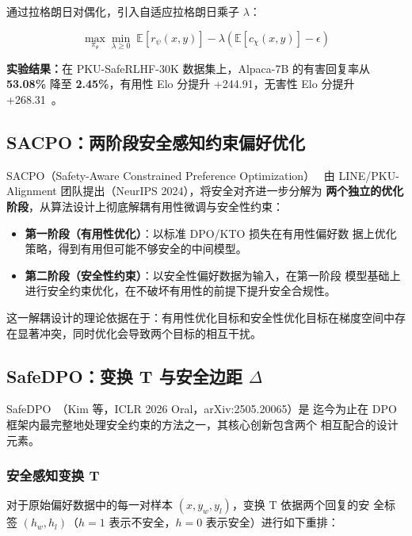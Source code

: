 \documentclass[12pt,a4paper,UTF8]{ctexart}
\newcommand{\E}{\mathbb{E}}
\newcommand{\pitheta}{\pi_{\theta}}
\begin{document}
通过拉格朗日对偶化，引入自适应拉格朗日乘子 $\lambda$：

\begin{equation}
  \max_{\pitheta}\min_{\lambda\geq 0}\;
    \E\!\left[r_\psi(x,y)\right]
    - \lambda\!\left(\E\!\left[c_\chi(x,y)\right] - \epsilon\right)
  \label{eq:lagrangian}
\end{equation}

\textbf{实验结果：}在 PKU-SafeRLHF-30K 数据集上，Alpaca-7B 的有害回复率从
\textbf{53.08\%} 降至 \textbf{2.45\%}，有用性 Elo 分提升 +244.91，无害性
Elo 分提升 +268.31~\cite{dai2023saferlhf}。

\subsection{SACPO：两阶段安全感知约束偏好优化}

SACPO（Safety-Aware Constrained Preference Optimization）~\cite{sacpo2024}
由 LINE/PKU-Alignment 团队提出（NeurIPS 2024），将安全对齐进一步分解为
\textbf{两个独立的优化阶段}，从算法设计上彻底解耦有用性微调与安全性约束：

\begin{itemize}[leftmargin=2em]
  \item \textbf{第一阶段（有用性优化）}：以标准 DPO/KTO 损失在有用性偏好数
    据上优化策略，得到有用但可能不够安全的中间模型。
  \item \textbf{第二阶段（安全性约束）}：以安全性偏好数据为输入，在第一阶段
    模型基础上进行安全约束优化，在不破坏有用性的前提下提升安全合规性。
\end{itemize}

这一解耦设计的理论依据在于：有用性优化目标和安全性优化目标在梯度空间中存
在显著冲突，同时优化会导致两个目标的相互干扰。

\subsection{SafeDPO：变换 T 与安全边距 $\Delta$}

SafeDPO~\cite{safedpo2026}（Kim 等，ICLR 2026 Oral，arXiv:2505.20065）是
迄今为止在 DPO 框架内最完整地处理安全约束的方法之一，其核心创新包含两个
相互配合的设计元素。

\subsubsection{安全感知变换 T}

对于原始偏好数据中的每一对样本 $(x, y_w, y_l)$，变换 T 依据两个回复的安
全标签 $(h_w, h_l)$（$h=1$ 表示不安全，$h=0$ 表示安全）进行如下重排：
\end{document}
